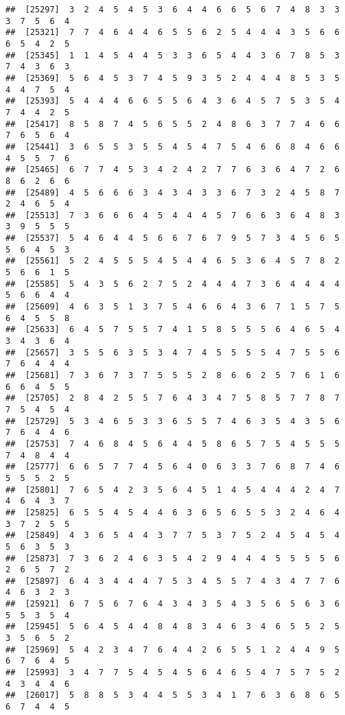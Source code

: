\documentclass[
]{book}
\begin{document}
\begin{verbatim}
##  [25297]  3  2  4  5  4  5  3  6  4  4  6  6  5  6  7  4  8  3  3  3  7  5  6  4
##  [25321]  7  7  4  6  4  4  6  5  5  6  2  5  4  4  4  3  5  6  6  6  5  4  2  5
##  [25345]  1  1  4  5  4  4  5  3  3  6  5  4  4  3  6  7  8  5  3  7  4  3  6  3
##  [25369]  5  6  4  5  3  7  4  5  9  3  5  2  4  4  4  8  5  3  5  4  4  7  5  4
##  [25393]  5  4  4  4  6  6  5  5  6  4  3  6  4  5  7  5  3  5  4  7  4  4  2  5
##  [25417]  8  5  8  7  4  5  6  5  5  2  4  8  6  3  7  7  4  6  6  7  6  5  6  4
##  [25441]  3  6  5  5  3  5  5  4  5  4  7  5  4  6  6  8  4  6  6  4  5  5  7  6
##  [25465]  6  7  7  4  5  3  4  2  4  2  7  7  6  3  6  4  7  2  6  8  6  2  6  6
##  [25489]  4  5  6  6  6  3  4  3  4  3  3  6  7  3  2  4  5  8  7  2  4  6  5  4
##  [25513]  7  3  6  6  6  4  5  4  4  4  5  7  6  6  3  6  4  8  3  3  9  5  5  5
##  [25537]  5  4  6  4  4  5  6  6  7  6  7  9  5  7  3  4  5  6  5  5  6  4  5  3
##  [25561]  5  2  4  5  5  5  4  5  4  4  6  5  3  6  4  5  7  8  2  5  6  6  1  5
##  [25585]  5  4  3  5  6  2  7  5  2  4  4  4  7  3  6  4  4  4  4  5  6  6  4  4
##  [25609]  4  6  3  5  1  3  7  5  4  6  6  4  3  6  7  1  5  7  5  6  4  5  5  8
##  [25633]  6  4  5  7  5  5  7  4  1  5  8  5  5  5  6  4  6  5  4  3  4  3  6  4
##  [25657]  3  5  5  6  3  5  3  4  7  4  5  5  5  5  4  7  5  5  6  7  6  4  4  4
##  [25681]  7  3  6  7  3  7  5  5  5  2  8  6  6  2  5  7  6  1  6  6  6  4  5  5
##  [25705]  2  8  4  2  5  5  7  6  4  3  4  7  5  8  5  7  7  8  7  7  5  4  5  4
##  [25729]  5  3  4  6  5  3  3  6  5  5  7  4  6  3  5  4  3  5  6  7  6  4  4  6
##  [25753]  7  4  6  8  4  5  6  4  4  5  8  6  5  7  5  4  5  5  5  7  4  8  4  4
##  [25777]  6  6  5  7  7  4  5  6  4  0  6  3  3  7  6  8  7  4  6  5  5  5  2  5
##  [25801]  7  6  5  4  2  3  5  6  4  5  1  4  5  4  4  4  2  4  7  4  6  4  3  7
##  [25825]  6  5  5  4  5  4  4  6  3  6  5  6  5  5  3  2  4  6  4  3  7  2  5  5
##  [25849]  4  3  6  5  4  4  3  7  7  5  3  7  5  2  4  5  4  5  4  5  6  3  5  3
##  [25873]  7  3  6  2  4  6  3  5  4  2  9  4  4  4  5  5  5  5  6  2  6  5  7  2
##  [25897]  6  4  3  4  4  4  7  5  3  4  5  5  7  4  3  4  7  7  6  4  6  3  2  3
##  [25921]  6  7  5  6  7  6  4  3  4  3  5  4  3  5  6  5  6  3  6  5  5  3  5  4
##  [25945]  5  6  4  5  4  4  8  4  8  3  4  6  3  4  6  5  5  2  5  3  5  6  5  2
##  [25969]  5  4  2  3  4  7  6  4  4  2  6  5  5  1  2  4  4  9  5  6  7  6  4  5
##  [25993]  3  4  7  7  5  4  5  4  5  6  4  6  5  4  7  5  7  5  2  4  3  4  4  6
##  [26017]  5  8  8  5  3  4  4  5  5  3  4  1  7  6  3  6  8  6  5  6  7  4  4  5

\end{verbatim}
\end{document}
